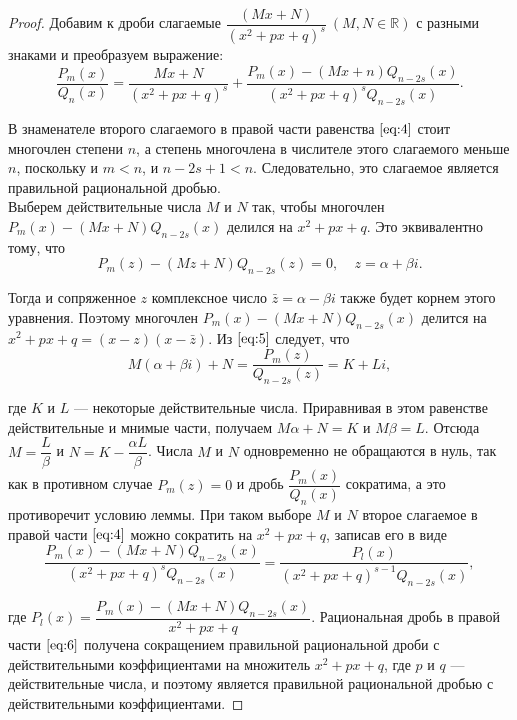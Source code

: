 \documentclass[12pt]{report}
\numberwithin{equation}{section}
\begin{document}
\begin{proof}
Добавим к дроби слагаемые $\dfrac{(Mx + N)}{(x^2 + px + q)^s}~(M,N \in \mathbb{R})$ с разными знаками и преобразуем выражение:
\begin{equation}\label{eq:4}
\frac{P_m(x)}{Q_n(x)} =\frac{Mx + N}{(x^2 + px + q)^s} + \frac{P_m(x) - (Mx+n)Q_{n-2s}(x)}{(x^2 + px + q)^s Q_{n-2s}(x)}. 
\end{equation}

В знаменателе второго слагаемого в правой части равенства $\eqref{eq:4}$ стоит многочлен степени $n$, а степень многочлена в числителе этого слагаемого меньше $n$, поскольку и $m < n$, и $n - 2s + 1 < n$. Следовательно, это слагаемое является правильной рациональной дробью.\\

Выберем действительные числа $M$ и $N$ так, чтобы многочлен $P_m(x) - (Mx + N) Q_{n-2s}(x)$ делился на $x^2 + px + q$. Это эквивалентно тому, что
\begin{equation}\label{eq:5}
P_m(z) - (Mz + N) Q_{n-2s}(z) = 0, ~~~~~ z = \alpha + \beta i. 
\end{equation}

Тогда и сопряженное $z$ комплексное число $\bar{z} = \alpha - \beta i$ также будет корнем этого уравнения. Поэтому многочлен $P_m(x) - (Mx + N) Q_{n-2s}(x)$ делится на $x^2 + px + q = (x-z)(x-\bar{z})$. Из $\eqref{eq:5}$ следует, что 
\[ M(\alpha + \beta i) + N = \frac{P_m(z)}{Q_{n-2s}(z)} = K + Li,   \]

где $K$ и $L$ --- некоторые действительные числа. Приравнивая в этом равенстве действительные и мнимые части, получаем $M \alpha + N = K$ и $M \beta = L$. Отсюда $M = \dfrac{L}{\beta} $ и $N = K - \dfrac{\alpha L}{\beta}$. Числа $M$ и $N$ одновременно не обращаются в нуль, так как в противном случае $P_m(z) = 0$ и дробь $\dfrac{P_m(x)}{Q_n(x)}$ сократима, а это противоречит условию леммы. При таком выборе $M$ и $N$ второе слагаемое в правой части $\eqref{eq:4}$ можно сократить на $x^2 + px + q$, записав его в виде
\begin{equation}\label{eq:6}
\frac{P_m(x) - (Mx + N) Q_{n-2s} (x)}{(x^2 + px + q)^s Q_{n-2s}(x)} = \frac{P_l(x)}{(x^2 + px + q)^{s-1} Q_{n-2s}(x)}, 
\end{equation}

где $P_l(x) = \dfrac{P_m(x) - (Mx + N) Q_{n-2s}(x)}{x^2 + px + q}$. Рациональная дробь в правой части $\eqref{eq:6}$ получена сокращением правильной рациональной дроби с действительными коэффициентами на множитель $x^2 + px + q$, где $p$ и $q$ --- действительные числа, и поэтому является правильной рациональной дробью с действительными коэффициентами.
\end{proof}
\end{document}
